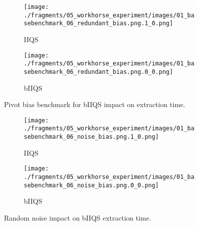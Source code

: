 \begin{figure}
    \centering
    \begin{subfigure}[b]{0.45\textwidth}
        \centering
        \texttt{[image: ./fragments/05\_workhorse\_experiment/images/01\_basebenchmark\_06\_redundant\_bias.png.1\_0.png]}
        \caption{IIQS}
        \label{FIG:WORKHORSE_BENCHMARK_06__0_0}
    \end{subfigure}
    \hfill
    \begin{subfigure}[b]{0.45\textwidth}
        \centering
        \texttt{[image: ./fragments/05\_workhorse\_experiment/images/01\_basebenchmark\_06\_redundant\_bias.png.0\_0.png]}
        \caption{bIIQS}
        \label{FIG:WORKHORSE_BENCHMARK_06__0_1}
    \end{subfigure}

    \caption{Pivot bias benchmark for bIIQS impact on extraction time.}
    \label{FIG:WORKHORSE_BENCHMARK_06}
\end{figure}


\begin{figure}
    \centering
    \begin{subfigure}[b]{0.45\textwidth}
        \centering
        \texttt{[image: ./fragments/05\_workhorse\_experiment/images/01\_basebenchmark\_06\_noise\_bias.png.1\_0.png]}
        \caption{IIQS}
        \label{FIG:WORKHORSE_BENCHMARK_07__0_0}
    \end{subfigure}
    \hfill
    \begin{subfigure}[b]{0.45\textwidth}
        \centering
        \texttt{[image: ./fragments/05\_workhorse\_experiment/images/01\_basebenchmark\_06\_noise\_bias.png.0\_0.png]}
        \caption{bIIQS}
        \label{FIG:WORKHORSE_BENCHMARK_07__0_1}
    \end{subfigure}

    \caption{Random noise impact on bIIQS extraction time.}
    \label{FIG:WORKHORSE_BENCHMARK_07}
\end{figure}


